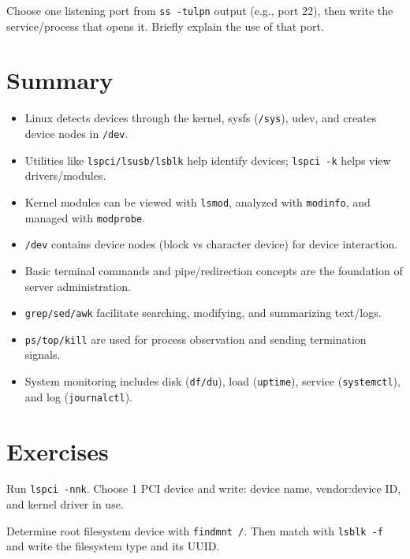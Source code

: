 \begin{exercisebox}[2.5]
Choose one listening port from \texttt{ss -tulpn} output (e.g., port 22), then write the service/process that opens it. Briefly explain the use of that port.
\end{exercisebox}

\section{Summary}
\begin{itemize}
    \item Linux detects devices through the kernel, sysfs (\texttt{/sys}), udev, and creates device nodes in \texttt{/dev}.
    \item Utilities like \texttt{lspci/lsusb/lsblk} help identify devices; \texttt{lspci -k} helps view drivers/modules.
    \item Kernel modules can be viewed with \texttt{lsmod}, analyzed with \texttt{modinfo}, and managed with \texttt{modprobe}.
    \item \texttt{/dev} contains device nodes (block vs character device) for device interaction.
    \item Basic terminal commands and pipe/redirection concepts are the foundation of server administration.
    \item \texttt{grep/sed/awk} facilitate searching, modifying, and summarizing text/logs.
    \item \texttt{ps/top/kill} are used for process observation and sending termination signals.
    \item System monitoring includes disk (\texttt{df/du}), load (\texttt{uptime}), service (\texttt{systemctl}), and log (\texttt{journalctl}).
\end{itemize}

\section{Exercises}

\begin{exercisebox}[2.A]
Run \texttt{lspci -nnk}. Choose 1 PCI device and write: device name, vendor:device ID, and kernel driver in use.
\end{exercisebox}

\begin{exercisebox}[2.B]
Determine root filesystem device with \texttt{findmnt /}. Then match with \texttt{lsblk -f} and write the filesystem type and its UUID.
\end{exercisebox}

